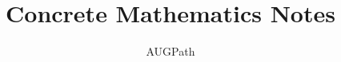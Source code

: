 \documentclass{book}
\begin{document}
\title{Concrete Mathematics Notes}
\author{AUGPath}

\maketitle



\end{document}
